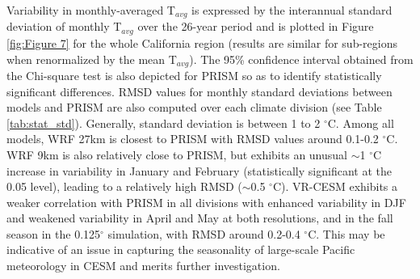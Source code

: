 Variability in monthly-averaged T$_{avg}$ is expressed by the interannual standard deviation of monthly T$_{avg}$ over the 26-year period and is plotted in Figure \ref{fig:Figure 7} for the whole California region (results are similar for sub-regions when renormalized by the mean T$_{avg}$). The 95\% confidence interval obtained from the Chi-square test is also depicted for PRISM so as to identify statistically significant differences.  RMSD values for monthly standard deviations between models and PRISM are also computed over each climate division (see Table \ref{tab:stat_std}). Generally, standard deviation is between 1 to 2 $^\circ$C. Among all models, WRF 27km is closest to PRISM with RMSD values around 0.1-0.2 $^\circ$C. WRF 9km is also relatively close to PRISM, but exhibits an unusual $\sim$1 $^\circ$C increase in variability in January and February (statistically significant at the 0.05 level), leading to a relatively high RMSD ($\sim$0.5 $^\circ$C). VR-CESM exhibits a weaker correlation with PRISM in all divisions with enhanced variability in DJF and weakened variability in April and May at both resolutions, and in the fall season in the 0.125$^\circ$ simulation, with RMSD around 0.2-0.4 $^\circ$C.  This may be indicative of an issue in capturing the seasonality of large-scale Pacific meteorology in CESM and merits further investigation.

